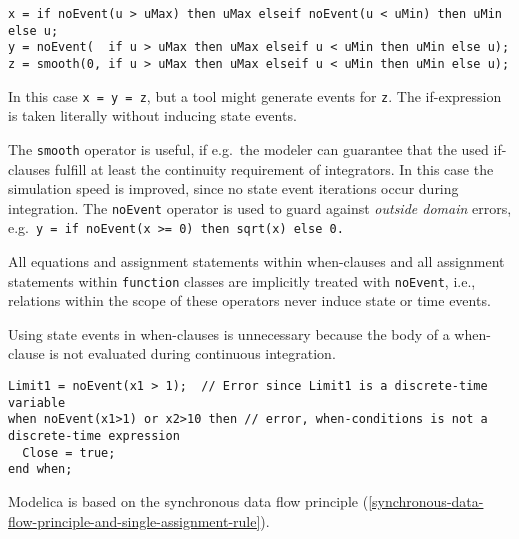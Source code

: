 \begin{example}
\begin{lstlisting}[language=modelica]
x = if noEvent(u > uMax) then uMax elseif noEvent(u < uMin) then uMin else u;
y = noEvent(  if u > uMax then uMax elseif u < uMin then uMin else u);
z = smooth(0, if u > uMax then uMax elseif u < uMin then uMin else u);
\end{lstlisting}

In this case \lstinline!x = y = z!, but a tool might generate events for \lstinline!z!.  The if-expression is taken literally without inducing state events.

The \lstinline!smooth! operator is useful, if e.g.\ the modeler can guarantee that the used if-clauses fulfill at least the continuity requirement of integrators.  In this case the simulation speed is improved, since no state event iterations occur during integration.  The \lstinline!noEvent! operator is used to guard against \emph{outside domain} errors, e.g.\ \lstinline!y = if noEvent(x >= 0) then sqrt(x) else 0.!
\end{example}

All equations and assignment statements within when-clauses and all assignment statements within \lstinline!function! classes are implicitly treated with \lstinline!noEvent!, i.e., relations within the scope of these operators never induce state or time events.

\begin{nonnormative}
Using state events in when-clauses is unnecessary because the body of a when-clause is not evaluated during continuous integration.
\end{nonnormative}

\begin{example}
\begin{lstlisting}[language=modelica]
Limit1 = noEvent(x1 > 1);  // Error since Limit1 is a discrete-time variable
when noEvent(x1>1) or x2>10 then // error, when-conditions is not a discrete-time expression
  Close = true;
end when;
\end{lstlisting}
\end{example}

Modelica is based on the synchronous data flow principle (\cref{synchronous-data-flow-principle-and-single-assignment-rule}).

